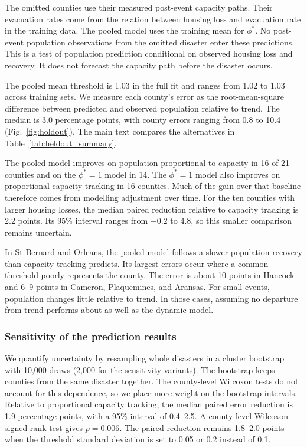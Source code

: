\documentclass[11pt]{article}
\begin{document}
The omitted counties use their measured post-event capacity paths. Their evacuation rates come from the relation between housing loss and evacuation rate in the training data. The pooled model uses the training mean for $\phi^*$. No post-event population observations from the omitted disaster enter these predictions. This is a test of population prediction conditional on observed housing loss and recovery. It does not forecast the capacity path before the disaster occurs.

The pooled mean threshold is 1.03 in the full fit and ranges from 1.02 to 1.03 across training sets. We measure each county's error as the root-mean-square difference between predicted and observed population relative to trend. The median is 3.0 percentage points, with county errors ranging from 0.8 to 10.4 (Fig.~\ref{fig:holdout}). The main text compares the alternatives in Table~\ref{tab:heldout_summary}.



The pooled model improves on population proportional to capacity in 16 of 21 counties and on the $\phi^*=1$ model in 14. The $\phi^*=1$ model also improves on proportional capacity tracking in 16 counties. Much of the gain over that baseline therefore comes from modelling adjustment over time. For the ten counties with larger housing losses, the median paired reduction relative to capacity tracking is 2.2 points. Its 95\% interval ranges from $-0.2$ to 4.8, so this smaller comparison remains uncertain.

In St Bernard and Orleans, the pooled model follows a slower population recovery than capacity tracking predicts. Its largest errors occur where a common threshold poorly represents the county. The error is about 10 points in Hancock and 6--9 points in Cameron, Plaquemines, and Aransas. For small events, population changes little relative to trend. In those cases, assuming no departure from trend performs about as well as the dynamic model.

\subsubsection{Sensitivity of the prediction results}
We quantify uncertainty by resampling whole disasters in a cluster bootstrap with 10{,}000 draws (2{,}000 for the sensitivity variants). The bootstrap keeps counties from the same disaster together. The county-level Wilcoxon tests do not account for this dependence, so we place more weight on the bootstrap intervals. Relative to proportional capacity tracking, the median paired error reduction is 1.9 percentage points, with a 95\% interval of 0.4--2.5. A county-level Wilcoxon signed-rank test gives $p=0.006$. The paired reduction remains 1.8--2.0 points when the threshold standard deviation is set to 0.05 or 0.2 instead of 0.1.
\end{document}
